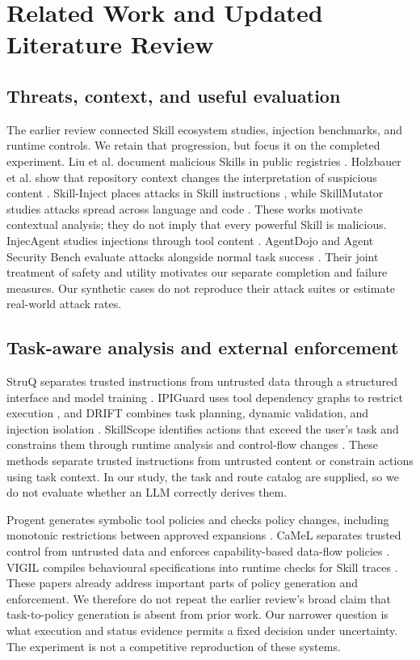 \documentclass[conference]{IEEEtran}
\begin{document}
\section{Related Work and Updated Literature Review}
\label{sec:related}
\subsection{Threats, context, and useful evaluation}
The earlier review connected Skill ecosystem studies, injection benchmarks, and runtime controls. We retain that progression, but focus it on the completed experiment. Liu et al. document malicious Skills in public registries \cite{liu}. Holzbauer et al. show that repository context changes the interpretation of suspicious content \cite{context}. Skill-Inject places attacks in Skill instructions \cite{skillinject}, while SkillMutator studies attacks spread across language and code \cite{skillmutator}. These works motivate contextual analysis; they do not imply that every powerful Skill is malicious. InjecAgent studies injections through tool content \cite{injecagent}. AgentDojo and Agent Security Bench evaluate attacks alongside normal task success \cite{agentdojo,asb}. Their joint treatment of safety and utility motivates our separate completion and failure measures. Our synthetic cases do not reproduce their attack suites or estimate real-world attack rates.

\subsection{Task-aware analysis and external enforcement}
StruQ separates trusted instructions from untrusted data through a structured interface and model training \cite{struq}. IPIGuard uses tool dependency graphs to restrict execution \cite{ipiguard}, and DRIFT combines task planning, dynamic validation, and injection isolation \cite{drift}. SkillScope identifies actions that exceed the user's task and constrains them through runtime analysis and control-flow changes \cite{skillscope}. These methods separate trusted instructions from untrusted content or constrain actions using task context. In our study, the task and route catalog are supplied, so we do not evaluate whether an LLM correctly derives them.

Progent generates symbolic tool policies and checks policy changes, including monotonic restrictions between approved expansions \cite{progent}. CaMeL separates trusted control from untrusted data and enforces capability-based data-flow policies \cite{camel}. VIGIL compiles behavioural specifications into runtime checks for Skill traces \cite{vigil}. These papers already address important parts of policy generation and enforcement. We therefore do not repeat the earlier review's broad claim that task-to-policy generation is absent from prior work. Our narrower question is what execution and status evidence permits a fixed decision under uncertainty. The experiment is not a competitive reproduction of these systems.
\end{document}

